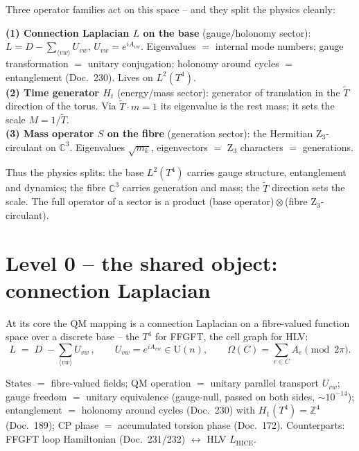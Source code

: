 Three operator families act on this space -- and they split the physics
cleanly:

\begin{technical}
\textbf{(1) Connection Laplacian $L$ on the base} (gauge/holonomy sector):
$L=D-\sum_{\langle vw\rangle}U_{vw}$, $U_{vw}=e^{iA_{vw}}$. Eigenvalues $=$
internal mode numbers; gauge transformation $=$ unitary conjugation; holonomy
around cycles $=$ entanglement (Doc.~230). Lives on $L^2(T^4)$.\\[2pt]
\textbf{(2) Time generator $H_t$} (energy/mass sector): generator of
translation in the $\tilde T$ direction of the torus. Via $\tilde T\cdot m=1$ its
eigenvalue is the rest mass; it sets the scale $M=1/\tilde T$.\\[2pt]
\textbf{(3) Mass operator $S$ on the fibre} (generation sector): the Hermitian
Z$_3$-circulant on $\mathbb{C}^3$. Eigenvalues $\sqrt{m_k}$, eigenvectors $=$
Z$_3$ characters $=$ generations.
\end{technical}

Thus the physics splits: the base $L^2(T^4)$ carries gauge structure,
entanglement and dynamics; the fibre $\mathbb{C}^3$ carries generation and mass;
the $\tilde T$ direction sets the scale. The full operator of a sector is a
product (base operator)\,$\otimes$\,(fibre Z$_3$-circulant).

\section{Level 0 -- the shared object: connection Laplacian}

At its core the QM mapping is a connection Laplacian on a fibre-valued function
space over a discrete base -- the $T^4$ for FFGFT, the cell graph for HLV:
\begin{equation}
  L \;=\; D \;-\!\!\sum_{\langle vw\rangle} U_{vw}\,,
  \qquad U_{vw}=e^{iA_{vw}}\in \mathrm{U}(n),
  \qquad \Omega(C)=\textstyle\sum_{e\in C}A_e \pmod{2\pi}.
\end{equation}

\begin{keyresult}
States $=$ fibre-valued fields; QM operation $=$ unitary parallel transport
$U_{vw}$; gauge freedom $=$ unitary equivalence (gauge-null, passed on both
sides, $\sim10^{-14}$); entanglement $=$ holonomy around cycles (Doc.~230) with
$H_1(T^4)=\mathbb{Z}^4$ (Doc.~189); CP phase $=$ accumulated torsion phase
(Doc.~172). Counterparts: FFGFT loop Hamiltonian (Doc.~231/232)
$\leftrightarrow$ HLV $L_{\mathrm{HICE}}$.
\end{keyresult}


